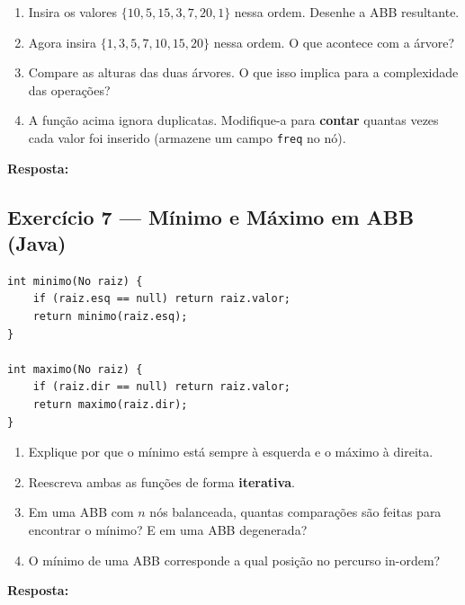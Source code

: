\documentclass[12pt, a4paper]{article}
\newenvironment{resposta}{%
    \begin{mdframed}[linecolor=black!30, backgroundcolor=white,
                     innertopmargin=10pt, innerbottommargin=30pt,
                     skipabove=6pt]
    \textbf{Resposta:}\\[4pt]
}{%
    \end{mdframed}
}
\begin{document}
\begin{enumerate}[label=(\alph*)]
    \item Insira os valores $\{10, 5, 15, 3, 7, 20, 1\}$ nessa ordem. Desenhe a ABB resultante.
    \item Agora insira $\{1, 3, 5, 7, 10, 15, 20\}$ nessa ordem. O que acontece com a árvore?
    \item Compare as alturas das duas árvores. O que isso implica para a complexidade das operações?
    \item A função acima ignora duplicatas. Modifique-a para \textbf{contar} quantas vezes cada valor foi inserido (armazene um campo \texttt{freq} no nó).
\end{enumerate}

\begin{resposta}
\vspace{5cm}
\end{resposta}

\newpage
\subsection*{Exercício 7 — Mínimo e Máximo em ABB (Java)}

\begin{lstlisting}[style=javastyle]
int minimo(No raiz) {
    if (raiz.esq == null) return raiz.valor;
    return minimo(raiz.esq);
}

int maximo(No raiz) {
    if (raiz.dir == null) return raiz.valor;
    return maximo(raiz.dir);
}
\end{lstlisting}

\begin{enumerate}[label=(\alph*)]
    \item Explique por que o mínimo está sempre à esquerda e o máximo à direita.
    \item Reescreva ambas as funções de forma \textbf{iterativa}.
    \item Em uma ABB com $n$ nós balanceada, quantas comparações são feitas para encontrar o mínimo? E em uma ABB degenerada?
    \item O mínimo de uma ABB corresponde a qual posição no percurso in-ordem?
\end{enumerate}

\begin{resposta}
\vspace{4cm}
\end{resposta}
\end{document}
